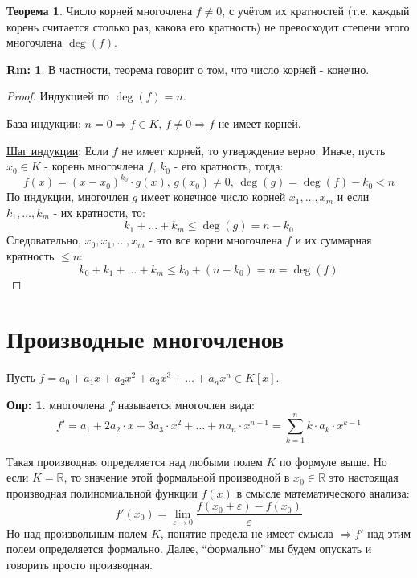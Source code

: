 \documentclass[12pt]{article}
\newcommand{\MR}{\mathbb{R}}
\newcommand{\VE}{\varepsilon}
\theoremstyle{definition}
\newtheorem{defn}{Опр:}
\newtheorem{rem}{Rm:}
\newtheorem{theorem}{Теорема}
\newcommand{\ddsum}[2]{\displaystyle\sum\limits_{#1}^{#2}}
\begin{document}
\begin{theorem}
	Число корней многочлена $f \neq 0$, с учётом их кратностей (т.е. каждый корень считается столько раз, какова его кратность) не превосходит степени этого многочлена $\deg(f)$.
\end{theorem}
\begin{rem}
	В частности, теорема говорит о том, что число корней - конечно.
\end{rem}
\begin{proof}
	Индукцией по $\deg(f) = n$.
	
	\uline{База индукции}: $n = 0 \Rightarrow f \in K, \, f \neq 0 \Rightarrow f$ не имеет корней.
	
	\uline{Шаг индукции}: Если $f$ не имеет корней, то утверждение верно. Иначе, пусть $x_0 \in K$ - корень многочлена $f$, $k_0$ - его кратность, тогда:
	$$
		f(x) = (x - x_0)^{k_0}{\cdot}g(x), \, g(x_0) \neq 0, \, \deg(g) = \deg(f) - k_0 < n
	$$
	По индукции, многочлен $g$ имеет конечное число корней $x_1, \dotsc, x_m$ и если $k_1,\dotsc, k_m$ - их кратности, то: 
	$$
		k_1 + \dotsc + k_m \leq \deg(g) = n - k_0
	$$
	Следовательно, $x_0, x_1,\dotsc,x_m$ - это все корни многочлена $f$ и их суммарная кратность $\leq n$:
	$$
		k_0 + k_1 + \dotsc + k_m \leq k_0 + (n - k_0) = n = \deg(f)
	$$
\end{proof}

\newpage
\section*{Производные многочленов}
Пусть $f = a_0 + a_1 x + a_2 x^2 + a_3x^3 + \dotsc + a_n x^n \in K[x]$.
\begin{defn}
	 многочлена $f$ называется многочлен вида:
	$$
		f' = a_1 + 2a_2{\cdot}x + 3a_3{\cdot}x^2 + \dotsc + na_n{\cdot}x^{n-1} = \ddsum{k = 1}{n}k{\cdot}a_k{\cdot}x^{k-1}
	$$
\end{defn}
Такая производная определяется над любыми полем $K$ по формуле выше. Но если $K = \MR$, то значение этой формальной производной в $x_0 \in \MR$ это настоящая производная полиномиальной функции $f(x)$ в смысле математического анализа:
$$
	f'(x_0) = \lim\limits_{\VE \to 0}\dfrac{f(x_0+\VE) - f(x_0)}{\VE}
$$
Но над произвольным полем $K$, понятие предела не имеет смысла $\Rightarrow f'$ над этим полем определяется формально. Далее, ``формально'' мы будем опускать и говорить просто производная.
\end{document}
